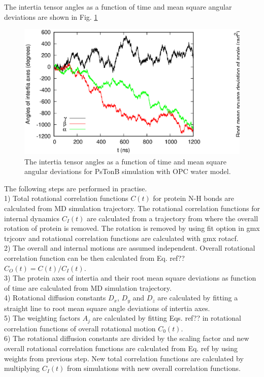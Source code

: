 \documentclass[pre,aps,floatfix,authordate1-4,twocolumn]{revtex4-1}
\begin{document}
The intertia tensor angles as a function of time and mean square angular
deviations are shown in Fig. \ref{exampleROTDIFFcalc}
\begin{figure}[!h]
  \includegraphics[width=18cm]{../Figs/exampleROTDIFFcalc.eps}%
  \caption{The intertia tensor angles as a function of time and mean square angular
    deviations for PsTonB simulation with OPC water model.
    \label{exampleROTDIFFcalc}}%
\end{figure}

The following steps are performed in practise. \\
1) Total rotational correlation functions $C(t)$ for protein N-H bonds are calculated from
MD simulation trajectory. The rotational correlation functions for internal dynamics $C_I(t)$ are
calculated from a trajectory from where the overall rotation of protein
is removed. The rotation is removed by using fit option in gmx trjconv and rotational
correlation functions are calculated with gmx rotacf. \\
2) The overall and internal motions are assumed independent. Overall
rotational correlation function can be then calculated from Eq. ref{??}
$C_O(t)=C(t)/C_I(t)$. \\
3) The protein axes of intertia and their root mean square deviations as function of
time are calculated from MD simulation trajectory. \\
4) Rotational diffusion constants $D_x$, $D_y$ and $D_z$ are calculated by fitting a straight line
to root mean square angle deviations of intertia axes. \\
5) The weighting factors $A_j$ are calculated by fitting Eqs. ref{??} in
rotational correlation functions of overall rotational motion $C_0(t)$. \\
6) The rotational diffusion constants are divided by the scaling factor and new
overall rotational correlation functions are calculated from Eq. ref {} by using
weights from previous step. New total correlation functions are calculated by
multiplying $C_I(t)$ from simulations with new overall correlation functions.
\end{document}
